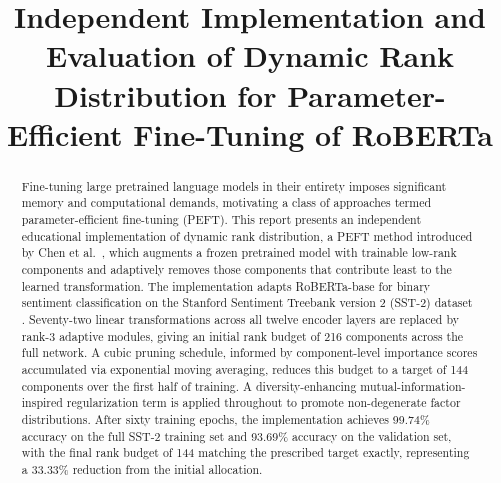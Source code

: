 \documentclass[conference]{IEEEtran}
\begin{document}
\title{Independent Implementation and Evaluation of Dynamic Rank
Distribution for Parameter-Efficient Fine-Tuning of RoBERTa}

\author{%
}

\maketitle

\begin{abstract}
Fine-tuning large pretrained language models in their entirety
imposes significant memory and computational demands, motivating
a class of approaches termed parameter-efficient fine-tuning
(PEFT). This report presents an independent educational
implementation of dynamic rank distribution, a PEFT method
introduced by Chen et al.\ \cite{chen2024dora}, which augments
a frozen pretrained model with trainable low-rank components
and adaptively removes those components that contribute least
to the learned transformation. The implementation adapts
RoBERTa-base \cite{liu2019roberta} for binary sentiment
classification on the Stanford Sentiment Treebank version 2
(SST-2) dataset \cite{wang2018glue}. Seventy-two linear
transformations across all twelve encoder layers are replaced
by rank-3 adaptive modules, giving an initial rank budget of
216 components across the full network. A cubic pruning
schedule, informed by component-level importance scores
accumulated via exponential moving averaging, reduces this
budget to a target of 144 components over the first half of
training. A diversity-enhancing mutual-information-inspired
regularization term is applied throughout to promote
non-degenerate factor distributions. After sixty training
epochs, the implementation achieves 99.74\% accuracy on the
full SST-2 training set and 93.69\% accuracy on the
validation set, with the final rank budget of 144 matching
the prescribed target exactly, representing a 33.33\%
reduction from the initial allocation.
\end{abstract}
\end{document}
